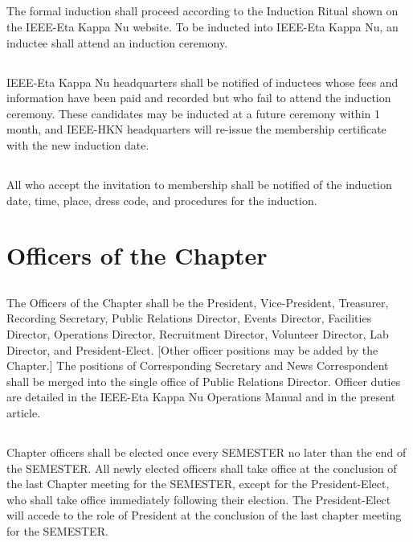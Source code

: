 \documentclass[10pt, oneside]{article}
\begin{document}
\subsection{}
The formal induction shall proceed according to the Induction Ritual shown on the IEEE-Eta Kappa Nu website. To be inducted into IEEE-Eta Kappa Nu, an inductee shall attend an induction ceremony.

\subsection{}
IEEE-Eta Kappa Nu headquarters shall be notified of inductees whose fees and information have been paid and recorded but who fail to attend the induction ceremony. These candidates may be inducted at a future ceremony within 1 month, and IEEE-HKN headquarters will re-issue the membership certificate with the new induction date.

\subsection{}
All who accept the invitation to membership shall be notified of the induction date, time, place, dress code, and procedures for the induction.


\section{Officers of the Chapter}
\subsection{} \label{Officers}
The Officers of the Chapter shall be the President, Vice-President, Treasurer, Recording Secretary, Public Relations Director, Events Director, Facilities Director, Operations Director, Recruitment Director, Volunteer Director, Lab Director, and President-Elect. [Other officer positions may be added by the Chapter.] The positions of Corresponding Secretary and News Correspondent shall be merged into the single office of Public Relations Director. Officer duties are detailed in the IEEE-Eta Kappa Nu Operations Manual and in the present article.

\subsection{}
Chapter officers shall be elected once every SEMESTER no later than the end of the SEMESTER. All newly elected officers shall take office at the conclusion of the last Chapter meeting for the SEMESTER, except for the President-Elect, who shall take office immediately following their election. The President-Elect will accede to the role of President at the conclusion of the last chapter meeting for the SEMESTER. 
\end{document}
